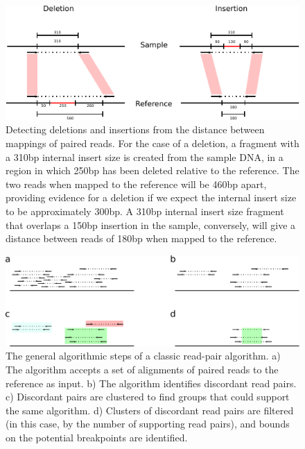 \begin{figure}
\centering
\includegraphics[width=\textwidth]{figures/rp_signatures.pdf}
\caption{Detecting deletions and insertions from the distance between mappings of paired reads. For the case of a deletion, a fragment with a 310bp internal insert size is created from the sample DNA, in a region in which 250bp has been deleted relative to the reference. The two reads when mapped to the reference will be 460bp apart, providing evidence for a deletion if we expect the internal insert size to be approximately 300bp. A 310bp internal insert size fragment that overlaps a 150bp insertion in the sample, conversely, will give a distance between reads of 180bp when mapped to the reference.}
\label{rp_signatures}
\end{figure}

\begin{figure}
\centering
\includegraphics[width=\textwidth]{figures/rp_method_workflow.pdf}
\caption{The general algorithmic steps of a classic read-pair algorithm. a) The algorithm accepts a set of alignments of paired reads to the reference as input. b) The algorithm identifies discordant read pairs. c) Discordant pairs are clustered to find groups that could support the same algorithm. d) Clusters of discordant read pairs are filtered (in this case, by the number of supporting read pairs), and bounds on the potential breakpoints are identified.}
\label{rm_method_workflow}
\end{figure}

